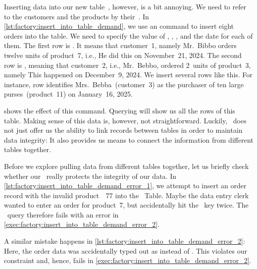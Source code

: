 %
%
%
%
%
%
%
%
%
%
%
%
Inserting data into our new table~, however, is a bit annoying.
We need to refer to the customers and the products by their~.
In \cref{lst:factory:insert_into_table_demand}, we use an  command to insert eight orders into the table.
We need to specify the value of , , , and the  date for each of them.
The first row is .
It means that customer~1, namely Mr.~Bibbo orders twelve units of product~7, i.e., 
He did this on November~21, 2024.
The second row is , meaning that customer~2, i.e., Mr.~Bebbo, ordered 2~units of product~3, namely 
This happened on December~9, 2024.
We insert several rows like this.
For instance, row  identifies Mrs.~Bebba~(customer~3) as the purchaser of ten large purses~(product~11) on January~16, 2025.

 shows the effect of this command.
Querying  will show us all the rows of this table.
Making sense of this data is, however, not straightforward.
Luckily, \sql\ does not just offer us the ability to link records between tables in order to maintain data integrity:
It also provides us means to connect the information from different tables together.

Before we explore pulling data from different tables together, let us briefly check whether our \dbms\ really protects the integrity of our data.
In \cref{lst:factory:insert_into_table_demand_error_1}, we attempt to insert an order record with the invalid product~~77 into the ~Table.
Maybe the data entry clerk wanted to enter an order for product~7, but accidentally hit the ~key twice.
The \sql\ query therefore fails with an error in \cref{exec:factory:insert_into_table_demand_error_2}.

A similar mistake happens in \cref{lst:factory:insert_into_table_demand_error_2}:
Here, the order data was accidentally typed out as  instead of .
This violates our constraint  and, hence, fails in \cref{exec:factory:insert_into_table_demand_error_2}.%
%
\FloatBarrier%
\endhsection%
%
